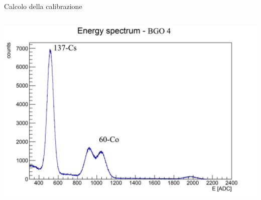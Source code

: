 \documentclass [xcolor=svgnames, 9pt] {beamer}
\begin{document}
\begin{frame}{Calcolo della calibrazione}
	\begin{columns}%
		\begin{column}{0.57\textwidth}%
				\centering
				\includegraphics[width=\linewidth]{img/ex1775.pdf}
				\begin{figure}
						\begin{table}[ht!]
						\centering
				\end{table}\end{figure}
			

\end{column}
\end{columns}
\end{frame}
\end{document}
